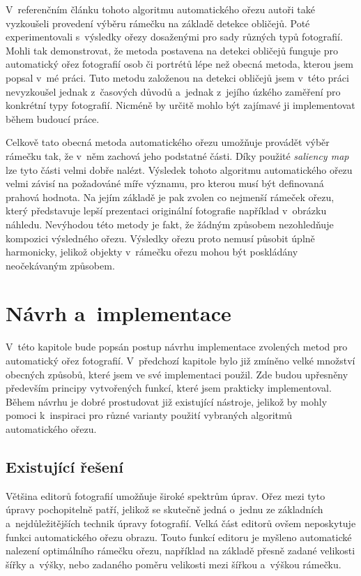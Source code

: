 V~referenčním článku tohoto algoritmu automatického ořezu \cite{Suh2003} autoři také vyzkoušeli provedení výběru rámečku na základě detekce obličejů. Poté experimentovali s~výsledky ořezy dosaženými pro sady různých typů fotografií. Mohli tak demonstrovat, že metoda postavena na detekci obličejů funguje pro automatický ořez fotografií osob či portrétů lépe než obecná metoda, kterou jsem popsal v~mé práci. Tuto metodu založenou na detekci obličejů jsem v~této práci nevyzkoušel jednak z~časových důvodů a~jednak z~jejího úzkého zaměření pro konkrétní typy fotografií. Nicméně by určitě mohlo být zajímavé ji implementovat během budoucí práce.

Celkově tato obecná metoda automatického ořezu umožňuje provádět výběr rámečku tak, že v~něm zachová jeho podstatné části. Díky použité \emph{saliency map} lze tyto části velmi dobře nalézt. Výsledek tohoto algoritmu automatického ořezu velmi závisí na požadováné míře významu, pro kterou musí být definovaná prahová hodnota. Na jejím základě je pak zvolen co nejmenší rámeček ořezu, který představuje lepší prezentaci originální fotografie například v~obrázku náhledu. Nevýhodou této metody je fakt, že žádným způsobem nezohledňuje kompozici výsledného ořezu. Výsledky ořezu proto nemusí působit úplně harmonicky, jelikož objekty v~rámečku ořezu mohou být poskládány neočekávaným způsobem.

\chapter{Návrh a~implementace}
V~této kapitole bude popsán postup návrhu implementace zvolených metod pro automatický ořez fotografií. V~předchozí kapitole bylo již zmíněno velké množství obecných způsobů, které jsem ve své implementaci použil. Zde budou upřesněny především principy vytvořených funkcí, které jsem prakticky implementoval. Během návrhu je dobré prostudovat již existující nástroje, jelikož by mohly pomoci k~inspiraci pro různé varianty použití vybraných algoritmů automatického ořezu.

\section{Existující řešení}
\label{sekce:3.1}
Většina editorů fotografií umožňuje široké spektrům úprav. Ořez mezi tyto úpravy pochopitelně patří, jelikož se skutečně jedná o~jednu ze základních a~nejdůležitějších technik úpravy fotografií. Velká část editorů ovšem neposkytuje funkci automatického ořezu obrazu. Touto funkcí editoru je myšleno automatické nalezení optimálního rámečku ořezu, například na základě přesně zadané velikosti šířky a~výšky, nebo zadaného poměru velikosti mezi šířkou a~výškou rámečku. 


